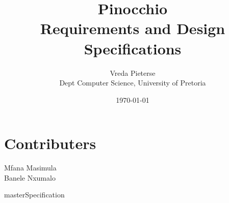 \documentclass[titlepage]{article}
\title{{\Huge Pinocchio} \\ Requirements and Design Specifications}
\author{Vreda Pieterse\\ Dept Computer Science, University of Pretoria}
\date{\today}
\begin{document}
\maketitle

\newpage
\section*{Contributers}
Mfana Masimula\\
Banele Nxumalo
\newpage
\tableofcontents

\newpage

{masterSpecification}
\end{document}
